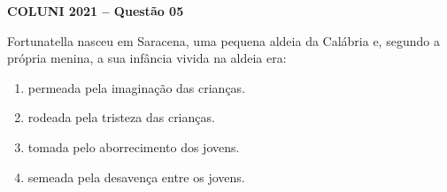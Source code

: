 \textbf{COLUNI 2021 -- Questão 05}\par\medskip Fortunatella nasceu em Saracena, uma pequena aldeia da Calábria e, segundo a própria menina, a sua infância vivida na aldeia era:\begin{enumerate}
\item permeada pela imaginação das crianças.
\item rodeada pela tristeza das crianças.
\item tomada pelo aborrecimento dos jovens.
\item semeada pela desavença entre os jovens.\end{enumerate}

